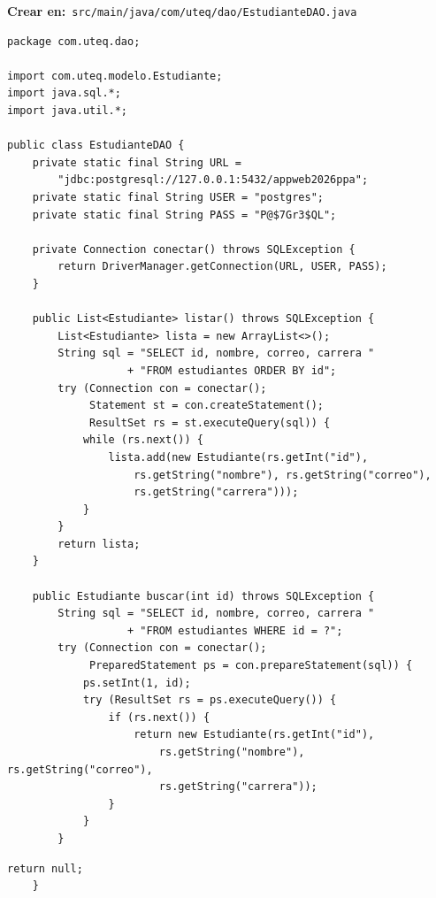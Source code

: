 \documentclass[11pt]{article}
\begin{document}
{\small\color{jwebazulo}\textbf{Crear en:}~}\texttt{src/\allowbreak{}main/\allowbreak{}java/\allowbreak{}com/\allowbreak{}uteq/\allowbreak{}dao/\allowbreak{}Estudiante\allowbreak{}DAO.\allowbreak{}java}\par\nobreak\vspace{-1pt}
\begin{cajacodigo}
\begin{lstlisting}[style=java]
package com.uteq.dao;

import com.uteq.modelo.Estudiante;
import java.sql.*;
import java.util.*;

public class EstudianteDAO {
    private static final String URL =
        "jdbc:postgresql://127.0.0.1:5432/appweb2026ppa";
    private static final String USER = "postgres";
    private static final String PASS = "P@$7Gr3$QL";

    private Connection conectar() throws SQLException {
        return DriverManager.getConnection(URL, USER, PASS);
    }

    public List<Estudiante> listar() throws SQLException {
        List<Estudiante> lista = new ArrayList<>();
        String sql = "SELECT id, nombre, correo, carrera "
                   + "FROM estudiantes ORDER BY id";
        try (Connection con = conectar();
             Statement st = con.createStatement();
             ResultSet rs = st.executeQuery(sql)) {
            while (rs.next()) {
                lista.add(new Estudiante(rs.getInt("id"),
                    rs.getString("nombre"), rs.getString("correo"),
                    rs.getString("carrera")));
            }
        }
        return lista;
    }

    public Estudiante buscar(int id) throws SQLException {
        String sql = "SELECT id, nombre, correo, carrera "
                   + "FROM estudiantes WHERE id = ?";
        try (Connection con = conectar();
             PreparedStatement ps = con.prepareStatement(sql)) {
            ps.setInt(1, id);
            try (ResultSet rs = ps.executeQuery()) {
                if (rs.next()) {
                    return new Estudiante(rs.getInt("id"),
                        rs.getString("nombre"), rs.getString("correo"),
                        rs.getString("carrera"));
                }
            }
        }
\end{lstlisting}
\end{cajacodigo}
\vspace{2pt}
\begin{cajacodigo}
\begin{lstlisting}[style=java]
        return null;
    }
\end{lstlisting}
\end{cajacodigo}
\end{document}
